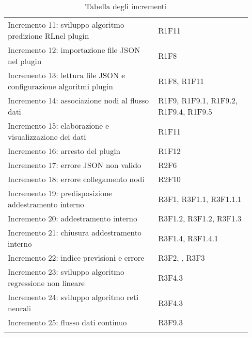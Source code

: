 \begin{longtable} {
		>{\raggedright\arraybackslash}p{85mm}
		>{\raggedleft\arraybackslash}p{40mm}
	}
	Incremento 11: sviluppo algoritmo predizione RL\glosp nel plugin &
	R1F11 \TBstrut \\ [2mm]
	
	Incremento 12: importazione file JSON nel plugin &
	R1F8 \TBstrut \\ [2mm]
	
	Incremento 13: lettura file JSON e configurazione algoritmi plugin &
	R1F8, R1F11 \TBstrut \\ [2mm]
	
	Incremento 14: associazione nodi al flusso dati &
	R1F9, R1F9.1, R1F9.2, R1F9.4, R1F9.5 \TBstrut \\ [2mm]
	
	Incremento 15: elaborazione e visualizzazione dei dati &
	R1F11 \TBstrut \\ [2mm]
	
	Incremento 16: arresto del plugin &
	R1F12 \TBstrut \\ [2mm]
	
	Incremento 17: errore JSON non valido &
	R2F6 \TBstrut \\ [2mm]
	
	Incremento 18: errore collegamento nodi &
	R2F10 \TBstrut \\ [2mm]
	
	Incremento 19: predisposizione addestramento interno &
	R3F1, R3F1.1, R3F1.1.1 \TBstrut \\ [2mm]
	
	Incremento 20: addestramento interno &
	R3F1.2, R3F1.2, R3F1.3 \TBstrut \\ [2mm]
	
	Incremento 21: chiusura addestramento interno &
	R3F1.4, R3F1.4.1 \TBstrut \\ [2mm]
	
	Incremento 22: indice previsioni e errore &
	R3F2, , R3F3 \TBstrut \\ [2mm]
	
	Incremento 23: sviluppo algoritmo regressione non lineare &
	R3F4.3 \TBstrut \\ [2mm]
	
	Incremento 24: sviluppo algoritmo reti neurali &
	R3F4.3 \TBstrut \\ [2mm]
	
	Incremento 25: flusso dati continuo &
	R3F9.3 \TBstrut \\ [2mm]
	\rowcolor{white}
	\caption{Tabella degli incrementi}
\end{longtable}


